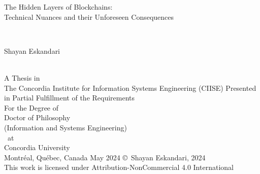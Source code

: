 
\thispagestyle{empty} %

\begin{center} 
\begin{Large} The Hidden Layers of Blockchains: \\ Technical Nuances and their Unforeseen Consequences\end{Large}\\[3em]
\begin{large} Shayan Eskandari \end{large}\\
\vfill
A Thesis in\\
The Concordia Institute for Information Systems Engineering (CIISE)
\vfill
Presented in Partial Fulfillment of the Requirements\\
For the Degree of\\
Doctor of Philosophy\\ 
(Information and Systems Engineering)\\~at\\
Concordia University\\
Montr\'{e}al, Qu\'{e}bec, Canada
\vfill
May 2024 
\vfill
\copyright~Shayan Eskandari, 2024\\
This work is licensed under Attribution-NonCommercial 4.0 International
\end{center}

